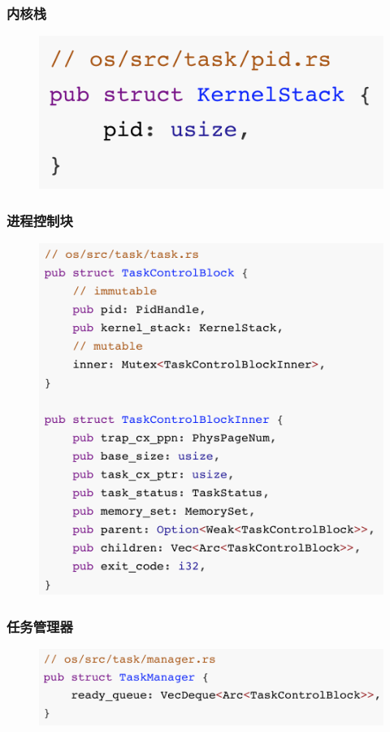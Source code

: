 \begin{frame}[fragile]
    \frametitle{内核栈}
% 
	\begin{figure}
		\centering
		\includegraphics[width=0.5\linewidth]{figs/kernelstack.png}
	\end{figure}



% 
\end{frame}
\begin{frame}[fragile]
    \frametitle{进程控制块}
% 
	\begin{figure}
		\centering
		\includegraphics[width=0.45\linewidth]{figs/PCB.png}
	\end{figure}



% 
\end{frame}
\begin{frame}[fragile]
    \frametitle{任务管理器}
% 
	\begin{figure}
		\centering
		\includegraphics[width=0.7\linewidth]{figs/task.png}
	\end{figure}



% 
\end{frame}
